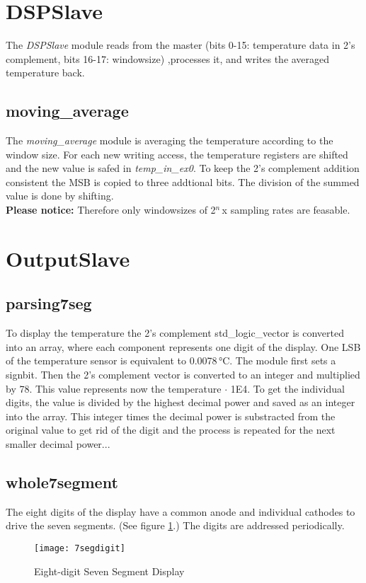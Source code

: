 \documentclass[%
	a4paper,
]
{article}
\begin{document}
\section{DSPSlave}
The \textit{DSPSlave} module reads from the master (bits 0-15: temperature data in 2's complement, bits 16-17: windowsize) ,processes it, and writes the averaged temperature back.
\subsection{moving_average}
The \textit{moving_average} module is averaging the temperature according to the window size. For each new writing access, the temperature registers are shifted and the new value is safed in \textit{temp_in_ex0}. To keep the 2's complement addition consistent the MSB is copied to three addtional bits. The division of the summed value is done by shifting.\\
\textbf{Please notice:} Therefore only windowsizes of 2$^n$\,x sampling rates are feasable.



\section{OutputSlave}

\subsection{parsing7seg}
To display the temperature the 2's complement std_logic_vector is converted into an array, where each component represents one digit of the display. One LSB of the temperature sensor is equivalent to 0.0078\,°C. The module first sets a signbit. Then the 2's complement vector is converted to an integer and multiplied by 78. This value represents now the temperature $\cdot$ 1E4. To get the individual digits, the value is divided by the highest decimal power and saved as an integer into the array. This integer times the decimal power is substracted from the original value to get rid of the digit and the process is repeated for the next smaller decimal power...

\subsection{whole7segment}
The eight digits of the display have a common anode and individual cathodes to drive the seven segments. (See figure \ref{7segdigit}.) The digits are addressed periodically.

\begin{figure}[H]
\centering
\texttt{[image: 7segdigit]}
\caption{Eight-digit Seven Segment Display}
\label{7segdigit}
\end{figure}
\end{document}
